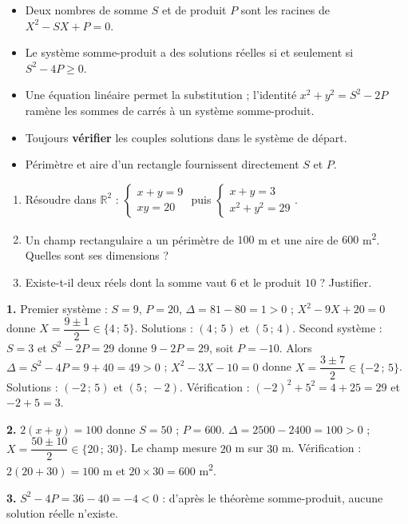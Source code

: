 \documentclass[11pt]{article}
\begin{document}
\begin{aretenir}
\begin{itemize}
\item Deux nombres de somme $S$ et de produit $P$ sont les racines de $X^2 - SX + P = 0$.
\item Le système somme-produit a des solutions réelles si et seulement si $S^2 - 4P \geq 0$.
\item Une équation linéaire permet la substitution ; l'identité $x^2+y^2 = S^2 - 2P$ ramène les sommes de carrés à un système somme-produit.
\item Toujours \textbf{vérifier} les couples solutions dans le système de départ.
\item Périmètre et aire d'un rectangle fournissent directement $S$ et $P$.
\end{itemize}
\end{aretenir}

\begin{exercice}
\begin{enumerate}
\item Résoudre dans $\mathbb{R}^2$ : $\begin{cases} x + y = 9 \\ xy = 20 \end{cases}$ puis $\begin{cases} x + y = 3 \\ x^2 + y^2 = 29 \end{cases}$.
\item Un champ rectangulaire a un périmètre de $100$ m et une aire de $600$ m\textsuperscript{2}. Quelles sont ses dimensions ?
\item Existe-t-il deux réels dont la somme vaut $6$ et le produit $10$ ? Justifier.
\end{enumerate}
\end{exercice}

\begin{corrige}
\textbf{1.} Premier système : $S=9$, $P=20$, $\Delta = 81 - 80 = 1 > 0$ ; $X^2 - 9X + 20 = 0$ donne $X = \dfrac{9 \pm 1}{2} \in \{4\,;\,5\}$. Solutions : $(4\,;\,5)$ et $(5\,;\,4)$. Second système : $S = 3$ et $S^2 - 2P = 29$ donne $9 - 2P = 29$, soit $P = -10$. Alors $\Delta = S^2 - 4P = 9 + 40 = 49 > 0$ ; $X^2 - 3X - 10 = 0$ donne $X = \dfrac{3 \pm 7}{2} \in \{-2\,;\,5\}$. Solutions : $(-2\,;\,5)$ et $(5\,;\,-2)$. Vérification : $(-2)^2 + 5^2 = 4 + 25 = 29$ et $-2 + 5 = 3$.

\textbf{2.} $2(x+y) = 100$ donne $S = 50$ ; $P = 600$. $\Delta = 2500 - 2400 = 100 > 0$ ; $X = \dfrac{50 \pm 10}{2} \in \{20\,;\,30\}$. Le champ mesure $20$ m sur $30$ m. Vérification : $2(20+30) = 100$ m et $20 \times 30 = 600$ m\textsuperscript{2}.

\textbf{3.} $S^2 - 4P = 36 - 40 = -4 < 0$ : d'après le théorème somme-produit, aucune solution réelle n'existe.
\end{corrige}
\end{document}
